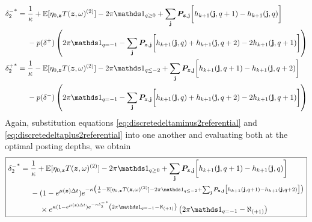 \begin{align}
\label{eq:discretedeltaminus2referential}
\begin{split}
{\delta_{2}^{-}}^* & = \frac{1}{\kappa} + \E[\eta_{0,\bz} T(\bz, \omega)^{(2)}] - 2 \pi \indicator_{q \geq 0} + \sum_\bj \bP_{\bz,\bj} \biggl[ h_{k+1}(\bj, q+1) - h_{k+1}(\bj, q) \biggr] \\
& \hphantom{{}={}} -p(\delta^+) \left( 2 \pi \indicator_{q = -1} - \sum_\bj \bP_{\bz,\bj} \biggl[ h_{k+1}(\bj, q) + h_{k+1}(\bj, q+2) -2 h_{k+1}(\bj, q+1)  \biggr] \right)
\end{split} \\
\begin{split}
\label{eq:discretedeltaplus2referential}
{\delta_{2}^+}^* & = \frac{1}{\kappa} - \E[\eta_{0,\bz} T(\bz, \omega)^{(2)}] - 2 \pi \indicator_{q \leq -2} + \sum_\bj \bP_{\bz,\bj} \biggl[ h_{k+1}(\bj, q+1) - h_{k+1}(\bj, q+2) \biggr] \\
& \hphantom{{}={}} -p(\delta^-) \left( 2 \pi \indicator_{q = -1} - \sum_\bj \bP_{\bz,\bj} \biggl[ h_{k+1}(\bj, q) + h_{k+1}(\bj, q+2) -2 h_{k+1}(\bj, q+1)  \biggr] \right)
\end{split}
\end{align}
Again, substitution equations \ref{eq:discretedeltaminus2referential} and \ref{eq:discretedeltaplus2referential} into one another and evaluating both at the optimal posting depths, we obtain
\begin{equation}
\label{eq:discretedeltaminus2feedback}
\boxed{
\begin{split}
{\delta_{2}^-}^* & = \frac{1}{\kappa} + \E[\eta_{0,\bz} T(\bz, \omega)^{(2)}] - 2 \pi \indicator_{q \geq 0} + \sum_\bj \bP_{\bz,\bj} \biggl[ h_{k+1}(\bj, q+1) - h_{k+1}(\bj, q) \biggr] \\
& \hphantom{{}={}} - (1-e^{\mu (\bz) \Delta t})e^{-\kappa \bigl( \frac{1}{\kappa} - \E[\eta_{0,\bz} T(\bz, \omega)^{(2)}] - 2 \pi \indicator_{q \leq -2} + \sum_\bj \bP_{\bz,\bj} \bigl[ h_{k+1}(\bj, q+1) - h_{k+1}(\bj, q+2) \bigr] \bigr) } \\
& \hphantom{{}={} {}-{}} \times e^{\kappa (1-e^{\mu (\bz) \Delta t})e^{-\kappa {\delta_{2}^-}^*} \left( 2 \pi \indicator_{q = -1} - \aleph_{(+1)} \right)} \left( 2 \pi \indicator_{q = -1} - \aleph_{(+1)} \right)
\end{split}
}
\end{equation}

